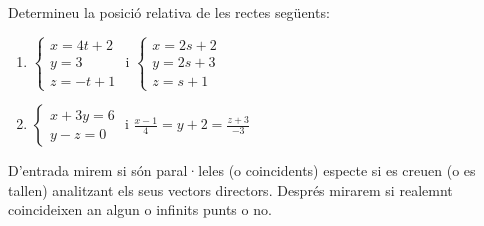 \Exercise Determineu la posició relativa de les rectes següents:

\begin{enumerate}
  \item $\begin{cases}x=4t+2\\y=3\\z=-t+1\end{cases}$ i $\begin{cases}x=2s+2\\y=2s+3\\z=s+1\end{cases}$
  \item $\begin{cases}x+3y=6\\y-z=0\end{cases}$ i $\frac{x-1}{4}=y+2=\frac{z+3}{-3}$
\end{enumerate}

\Answer D'entrada mirem si són paral·leles (o coincidents) especte si es creuen (o es tallen) analitzant els seus vectors directors. Després mirarem si realemnt coincideixen an algun o infinits punts o no.

